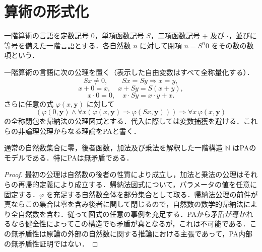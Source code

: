 \section{算術の形式化}
\begin{defn}[一階算術の言語]
一階算術の言語を定数記号 $0$，単項函数記号 $S$，二項函数記号 $+$ 及び $\cdot$，並びに等号を備えた一階言語とする．各自然数 $n$ に対して閉項 $\overline n=S^n0$ をその数の数項という．
\end{defn}
\begin{axiom}[Peano算術]
一階算術の言語に次の公理を置く（表示した自由変数はすべて全称量化する）．
\[
Sx\ne0,\qquad Sx=Sy\Rightarrow x=y,
\]
\[
x+0=x,\quad x+Sy=S(x+y),
\]
\[
x\cdot0=0,\quad x\cdot Sy=x\cdot y+x.
\]
さらに任意の式 $\varphi(x,\boldsymbol y)$ に対して
\[
(\varphi(0,\boldsymbol y)\land\forall x(\varphi(x,\boldsymbol y)\Rightarrow\varphi(Sx,\boldsymbol y)))\Rightarrow\forall x\,\varphi(x,\boldsymbol y)
\]
の全称閉包を帰納法の公理図式とする．代入に際しては変数捕獲を避ける．これらの非論理公理からなる理論をPAと書く．
\end{axiom}
\begin{prop}[標準自然数構造]
通常の自然数集合に零，後者函数，加法及び乗法を解釈した一階構造 $\mathbb N$ はPAのモデルである．特にPAは無矛盾である．
\end{prop}
\begin{proof}
最初の公理は自然数の後者の性質により成立し，加法と乗法の公理はそれらの再帰的定義により成立する．帰納法図式について，パラメータの値を任意に固定する．$\varphi$ を充足する自然数全体を部分集合として取る．帰納法公理の前件が真ならこの集合は零を含み後者に関して閉じるので，自然数の数学的帰納法により全自然数を含む．従って図式の任意の事例を充足する．PAから矛盾が導かれるなら健全性によってこの構造でも矛盾が真となるが，これは不可能である．この無矛盾性は原論の外部の自然数に関する推論における主張であって，PA内部の無矛盾性証明ではない．
\end{proof}
